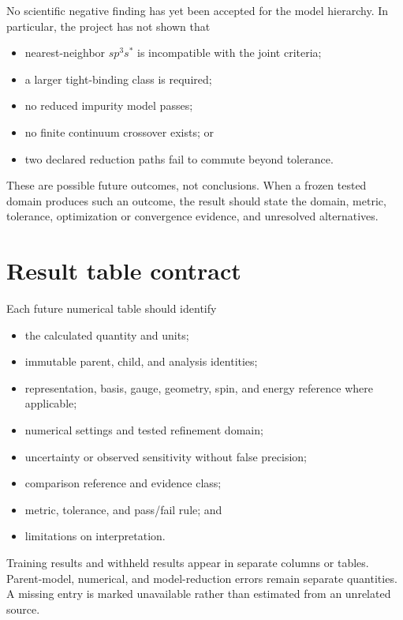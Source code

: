 No scientific negative finding has yet been accepted for the model hierarchy.
In particular, the project has not shown that

\begin{itemize}
  \item nearest-neighbor $sp^3s^{\ast}$ is incompatible with the joint criteria;
  \item a larger tight-binding class is required;
  \item no reduced impurity model passes;
  \item no finite continuum crossover exists; or
  \item two declared reduction paths fail to commute beyond tolerance.
\end{itemize}

These are possible future outcomes, not conclusions. When a frozen tested domain
produces such an outcome, the result should state the domain, metric, tolerance,
optimization or convergence evidence, and unresolved alternatives.

\section{Result table contract}

Each future numerical table should identify

\begin{itemize}
  \item the calculated quantity and units;
  \item immutable parent, child, and analysis identities;
  \item representation, basis, gauge, geometry, spin, and energy reference where
    applicable;
  \item numerical settings and tested refinement domain;
  \item uncertainty or observed sensitivity without false precision;
  \item comparison reference and evidence class;
  \item metric, tolerance, and pass/fail rule; and
  \item limitations on interpretation.
\end{itemize}

Training results and withheld results appear in separate columns or tables.
Parent-model, numerical, and model-reduction errors remain separate quantities.
A missing entry is marked unavailable rather than estimated from an unrelated
source.

